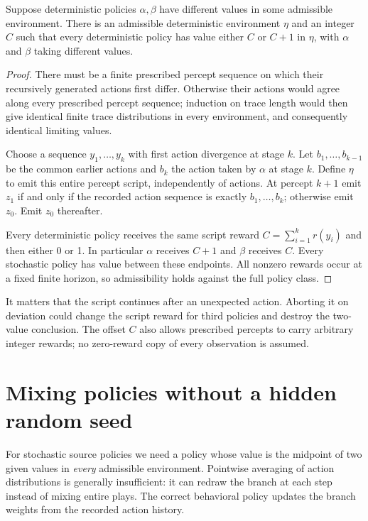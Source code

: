 \documentclass[11pt]{article}
\begin{document}
\begin{lemma}\label{lem:separator}
Suppose deterministic policies $\alpha,\beta$ have different values
in some admissible environment. There is an admissible deterministic
environment $\eta$ and an integer $C$ such that every deterministic
policy has value either $C$ or $C+1$ in $\eta$, with $\alpha$ and
$\beta$ taking different values.
\end{lemma}
\begin{proof}
There must be a finite prescribed percept sequence on which their
recursively generated actions first differ. Otherwise their actions
would agree along every prescribed percept sequence; induction on
trace length would then give identical finite trace distributions in
every environment, and consequently identical limiting values.

Choose a sequence $y_1,\ldots,y_k$ with first action divergence at
stage $k$. Let $b_1,\ldots,b_{k-1}$ be the common earlier actions and
$b_k$ the action taken by $\alpha$ at stage $k$.
Define $\eta$ to emit this entire percept script, independently of
actions. At percept $k+1$ emit $z_1$ if and only if the recorded action
sequence is exactly $b_1,\ldots,b_k$; otherwise emit $z_0$.
Emit $z_0$ thereafter.

Every deterministic policy receives the same script reward
$C=\sum_{i=1}^k r(y_i)$ and then either 0 or 1. In particular $\alpha$
receives $C+1$ and $\beta$ receives $C$. Every stochastic policy has
value between these endpoints. All nonzero rewards occur at a fixed
finite horizon, so admissibility holds against the full policy class.
\end{proof}

It matters that the script continues after an unexpected action.
Aborting it on deviation could change the script reward for third
policies and destroy the two-value conclusion. The offset $C$ also
allows prescribed percepts to carry arbitrary integer rewards; no
zero-reward copy of every observation is assumed.

\section{Mixing policies without a hidden random seed}

For stochastic source policies we need a policy whose value is the
midpoint of two given values in \emph{every} admissible environment.
Pointwise averaging of action distributions is generally insufficient:
it can redraw the branch at each step instead of mixing entire plays.
The correct behavioral policy updates the branch weights from the
recorded action history.
\end{document}
